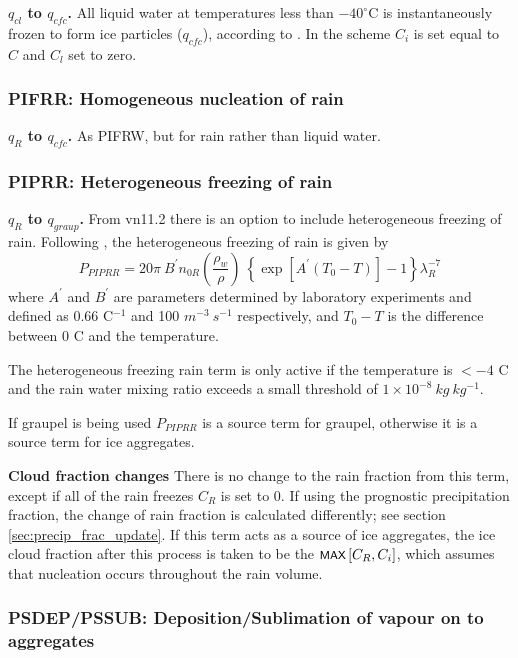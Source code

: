 \documentclass{UMDP_article}
\newcommand{\mmax}[1] {\mbox{\footnotesize \sf MAX} \left[#1\right]  }
\def\bq{\begin{equation}}
\def\eq{\end{equation}}
\begin{document}
\textbf{$q_{cl}$ to $q_{cfc}$.} All liquid water at temperatures less than 
$-40^{\circ}$C is instantaneously frozen to form ice particles ($q_{cfc}$), 
according to \cite{Rogers:Yau:1989}. 
In the scheme $C_i$ is set equal to $C$ and $C_l$ set to zero.

\subsubsection{PIFRR: Homogeneous nucleation of rain}

\textbf{$q_{R}$ to $q_{cfc}$.} As PIFRW, but for rain rather than
liquid water.

\subsubsection{PIPRR: Heterogeneous freezing of rain}

\textbf{$q_{R}$ to $q_{graup}$.} From vn11.2 there is an option to include 
heterogeneous freezing of rain. Following \citealp{Bigg:1953}, the heterogeneous
freezing of rain is given by
\bq
P_{PIPRR}=20\pi\ B^\prime n_{0R}\left(\frac{\rho_w}{\rho}\right)\ 
             \left\{\exp{\left[A^\prime\left(T_0-T\right)\right]}-1\right\}\lambda_R^{-7}
\label{eq:mic_rainfreeze}
\eq
where $A^\prime$ and $B^\prime$ are parameters determined by
laboratory experiments and defined as $0.66$ \textdegree C$^{-1}$ 
and 100 $m^{-3}~ s^{-1}$ respectively,
and $T_0-T$ is the difference between $0$ \textdegree C and the temperature.

The heterogeneous freezing rain term is only active if the temperature is 
$< -4$ \textdegree C and the rain water mixing ratio exceeds a small 
threshold of $1\times10^{-8}~kg~ kg^{-1}$.

If graupel is being used $P_{PIPRR}$ is a source term for graupel, otherwise it is 
a source term for ice aggregates. 

\textbf{Cloud fraction changes} There is no change to the rain fraction from 
this term, except if all of the rain freezes $C_R$ is set to $0$.
If using the prognostic precipitation fraction, the change of rain fraction
is calculated differently; see section \ref{sec:precip_frac_update}.
If this term acts as a source of ice aggregates, the ice cloud fraction after this
process is taken to be the $\mmax {C_R,C_i}$, which assumes that nucleation
occurs throughout the rain volume. 

\subsubsection{PSDEP/PSSUB:  Deposition/Sublimation of vapour on to aggregates}
\label{sec:psdep_pssub}
\end{document}
